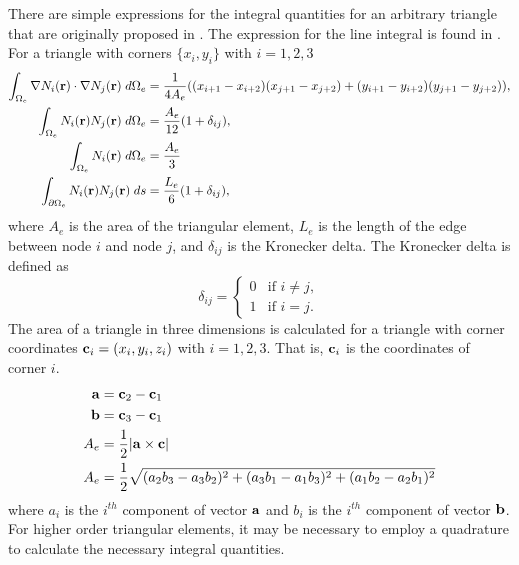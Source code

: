       There are simple expressions
      for the integral quantities for an arbitrary triangle that are originally
      proposed in \cite{textbookwhite}. The expression for
      the line integral is found in \cite{computerLab}. For a triangle with 
      corners $\{ x_i,y_i \}$ with $i=1,2,3$
      \begin{align}
        \int_{\Omega_e} \mathbf{\nabla} N_i(\mathbf{r}) \cdot \mathbf{\nabla} N_j(\mathbf{r}) 
          \;d\Omega_e &= \frac{1}{4 A_e}
          ((x_{i+1}-x_{i+2})(x_{j+1}-x_{j+2}) + 
          (y_{i+1}-y_{i+2})(y_{j+1}-y_{j+2})), \\
        \int_{\Omega_e} N_i(\mathbf{r}) N_j(\mathbf{r}) \;d\Omega_e &= 
          \frac{A_e}{12} (1+\delta_{ij}), \\
        \int_{\Omega_e} N_i(\mathbf{r}) \;d\Omega_e &= \frac{A_e}{3} \\
        \int_{\partial \Omega_e} N_i(\mathbf{r}) N_j(\mathbf{r}) \;ds &=
          \frac{L_e}{6}(1+\delta_{ij}), \\
      \end{align}
      where $A_e$ is the area of the triangular element, $L_e$ is the length of 
      the edge between node $i$ and node $j$, and $\delta_{ij}$ is the Kronecker
      delta.
      The Kronecker delta is defined as
      \begin{equation} \label{eq:kroneker_delta}
        \delta_{ij} =
        \begin{cases}
          0 & \text{if } i \ne j, \\
          1 & \text{if } i = j.
        \end{cases}
      \end{equation}
      The area of a triangle in three dimensions is calculated for a triangle
      with corner coordinates $\mathbf{c}_i = (x_i, y_i, z_i)$ with $i=1,2,3$.
      That is, $\mathbf{c}_i$ is the coordinates of corner $i$.
      \begin{align}
        \mathbf{a} &= \mathbf{c}_2 - \mathbf{c}_1 \\
        \mathbf{b} &= \mathbf{c}_3 - \mathbf{c}_1 \\
        A_e &= \frac{1}{2} \lvert \mathbf{a} \times \mathbf{c} \rvert \\
        \label{eq:area_triangle}
        A_e &= \frac{1}{2} \sqrt{ (a_2 b_3 - a_3 b_2)^2 + (a_3 b_1 - a_1 b_3)^2 +
          (a_1 b_2 - a_2 b_1)^2}
      \end{align}
      where $a_i$ is the $i^{th}$ component of vector $\mathbf{a}$ and $b_i$ is the
      $i^{th}$ component of vector $\mathbf{b}$.
      For higher order triangular elements, it may be necessary to employ a 
      quadrature to calculate the necessary integral quantities.

